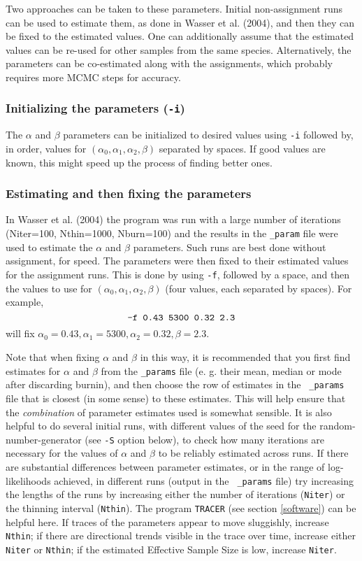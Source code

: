 \documentclass[10pt,titlepage,times,letterpaper]{article}
\begin{document}
Two approaches can be taken to these parameters.  Initial non-assignment
runs can be used to estimate them, as done in Wasser et al. (2004), and then
they can be fixed to the estimated values.  One can additionally assume
that the estimated values can be re-used for other samples from the same
species.  Alternatively, the parameters can be co-estimated along with
the assignments, which probably requires more MCMC steps for accuracy.

\subsubsection{Initializing the parameters ({\tt -i})}

The $\alpha$ and $\beta$ parameters can be initialized to desired values
using {\tt -i} followed by, in order, values for 
$(\alpha_0,\alpha_1,\alpha_2,\beta)$ separated by spaces.
If good values are known, this might speed up the process of finding better
ones.  

\subsubsection{Estimating and then fixing the parameters}

In Wasser et al. (2004)
the program was run with a large number of iterations ({Niter=100, Nthin=1000,
Nburn=100}) and the results in the {\tt \_param} file were used to estimate
the $\alpha$ and $\beta$ parameters.  Such runs are best done without assignment,
for speed.  The parameters were then fixed to their estimated values for the
assignment runs.  This is done by using
{\tt -f}, followed by a space, and then the values
to use for $(\alpha_0,\alpha_1,\alpha_2,\beta)$ (four values, each
separated by spaces).  
For example,
$$\text{\tt -f 0.43 5300 0.32 2.3}$$ will fix $\alpha_0 = 0.43, \alpha_1 =
5300, \alpha_2 = 0.32, \beta = 2.3$.

Note that when fixing $\alpha$ and $\beta$ in this way, it
is recommended that you first find estimates for $\alpha$ and $\beta$
from the {\tt \_params} file (e. g. their mean, median or mode after
discarding burnin), and then choose the row of estimates in the {\tt
\_params} file that is closest (in some sense) to these
estimates. This will help ensure that the {\it combination} of
parameter estimates used is somewhat sensible.
It is also helpful to do
several initial runs, with different values of the seed for the
random-number-generator (see {\tt -S} option below), to check how many
iterations are necessary for the values of $\alpha$ and $\beta$ to be
reliably estimated across runs. 
If there are
substantial differences between parameter estimates, or in the range
of log-likelihoods achieved, in different runs (output in the {\tt
\_params} file) try increasing the lengths of the runs by increasing
either the number of iterations ({\tt Niter}) or the thinning interval
({\tt Nthin}).  The program {\tt TRACER} (see section \ref{software}) can be
helpful here.  If traces of the parameters appear to move sluggishly,
increase {\tt Nthin}; if there are directional trends visible in the
trace over time, increase either {\tt Niter} or {\tt Nthin}; if the
estimated Effective Sample Size is low, increase {\tt Niter}.
\end{document}
